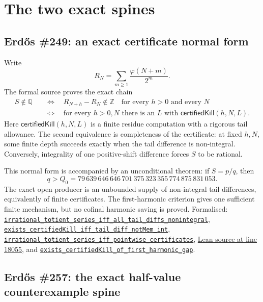 \documentclass[11pt]{article}
\newcommand{\commit}{81150c1c6fdd4cd51e76d3aa0de344341e0e9e7c}
\newcommand{\repobase}{https://github.com/wcook04/plectis-lean-erdos249-257/blob/\commit}
\newcommand{\PK}{Erdos249257}
\newcommand{\lrefx}[3]{\href{\repobase/\PK/#1\#L#2}{\nolinkurl{#3}}}
\newcommand{\lloc}[2]{\href{\repobase/\PK/#1\#L#2}{Lean source at line #2}}
\theoremstyle{definition}
\theoremstyle{remark}
\newcommand{\Z}{\mathbb{Z}}
\newcommand{\Q}{\mathbb{Q}}
\newcommand{\ph}{\varphi}
\newcommand{\Qzero}{Q_0}
\begin{document}
\section{The two exact spines}\label{sec:spines}

\subsection{Erd\H{o}s \#249: an exact certificate normal form}
\label{res:249story}

Write
\[
 R_N=\sum_{m\geq1}\frac{\ph(N+m)}{2^m}.
\]
The formal source proves the exact chain
\[
\begin{split}
 S\notin\Q
 &\quad\Longleftrightarrow\quad
   R_{N+h}-R_N\notin\Z
   \quad\text{for every }h>0\text{ and every }N\\
 &\quad\Longleftrightarrow\quad
   \text{for every }h>0,N\text{ there is an }L
   \text{ with }\textsf{certifiedKill}(h,N,L).
\end{split}
\]
Here \(\textsf{certifiedKill}(h,N,L)\) is a finite residue computation with a
rigorous tail allowance.  The second equivalence is completeness of the
certificate: at fixed \(h,N\), some finite depth succeeds exactly when the
tail difference is non-integral.  Conversely, integrality of one
positive-shift difference forces \(S\) to be rational.

This normal form is accompanied by an unconditional theorem: if \(S=p/q\),
then
\[
 q>\Qzero
 =79\,639\,646\,646\,701\,375\,323\,355\,774\,875\,831\,053.
\]
The exact open producer is an unbounded supply of non-integral tail
differences, equivalently of finite certificates.  The first-harmonic
criterion gives one sufficient finite mechanism, but no cofinal harmonic
saving is proved.  Formalised:
\lrefx{LcmConeFlatness.lean}{386}{irrational_totient_series_iff_all_tail_diffs_nonintegral},
\lrefx{LcmConeFlatness.lean}{316}{exists_certifiedKill_iff_tail_diff_notMem_int},
\lrefx{LcmConeFlatness.lean}{399}{irrational_totient_series_iff_pointwise_certificates},
\lloc{CertificateKernel.lean}{18055}, and
\lrefx{FirstHarmonicGap.lean}{128}{exists_certifiedKill_of_first_harmonic_gap}.

\subsection{Erd\H{o}s \#257: the exact half-value counterexample spine}
\label{res:halfstory}
\end{document}

